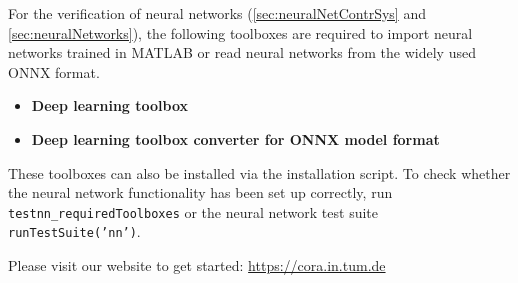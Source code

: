 For the verification of neural networks (\cref{sec:neuralNetContrSys} and \cref{sec:neuralNetworks}),
the following toolboxes are required to import neural networks trained in MATLAB or read neural networks from the widely used ONNX format.
\begin{itemize}
	\item \textbf{Deep learning toolbox}
	\item \textbf{Deep learning toolbox converter for ONNX model format}
\end{itemize}

These toolboxes can also be installed via the installation script.
To check whether the neural network functionality has been set up correctly, run \texttt{testnn\_requiredToolboxes} or the neural network test suite \texttt{runTestSuite('nn')}.

Please visit our website to get started: \url{https://cora.in.tum.de}
